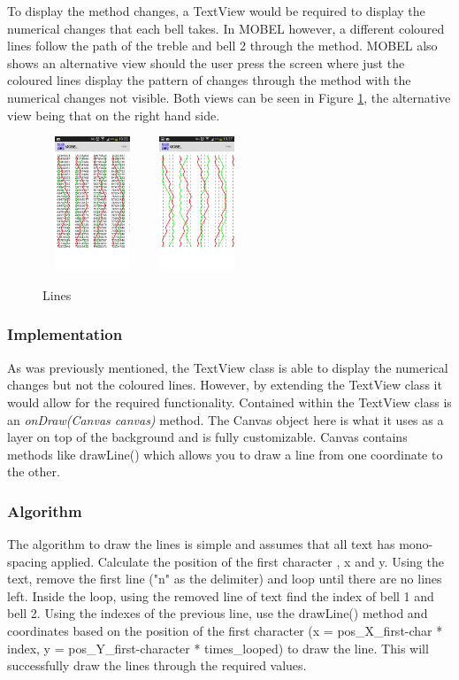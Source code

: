 \documentclass{l4proj}
\begin{document}
To display the method changes, a TextView would be required to display the numerical changes that each bell takes.  In MOBEL however, a different coloured lines follow the path of the treble and bell 2 through the method.  MOBEL also shows an alternative view should the user press the screen where just the coloured lines display the pattern of changes through the method with the numerical changes not visible. Both views can be seen in Figure \ref{Lines}, the alternative view being that on the right hand side.

\begin{figure}
\centering
\includegraphics[height=4cm,width=3cm]{lines.png}
\hspace{1cm}
\includegraphics[height=4cm,width=3cm]{lines2.png}
\caption{Lines}
\label{Lines}
\end{figure}

\subsubsection{Implementation}
As was previously mentioned, the TextView class is able to display the numerical changes but not the coloured lines.  However, by extending the TextView class it would allow for the required functionality.  Contained within the TextView class is an \textit{onDraw(Canvas canvas)} method. The Canvas object here is what it uses as a layer on top of the background and is fully customizable.  Canvas contains methods like drawLine() which allows you to draw a line from one coordinate to the other.

\subsubsection{Algorithm}
The algorithm to draw the lines is simple and assumes that all text has mono-spacing applied.  Calculate the position of the first character , x and y.  Using the text, remove the first line ("n" as the delimiter) and loop until there are no lines left. Inside the loop, using the removed line of text find the index of bell 1 and bell 2.  Using the indexes of the previous line, use the drawLine() method and coordinates based on the position of the first character (x = pos\_X\_first-char * index, y = pos\_Y\_first-character * times\_looped) to draw the line. This will successfully draw the lines through the required values. 
\end{document}
